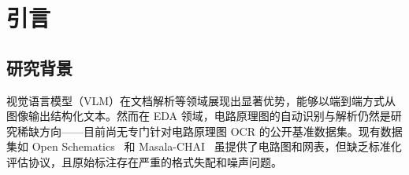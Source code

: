 \maketitle

\begin{abstract}
我们基于 PaddleOCR-VL-0.9B 训练了一个用于电路原理图 OCR 的模型，涵盖数据集构建、多阶段受控实验与完整开源生态。主要贡献如下：

(1) \textbf{数据集}：Dataset A 含 1,820 个经 7 轮递进式验证的标注样本（自动化校验 $\to$ 半自动清洗 $\to$ KiCad 网表交叉验证 $\to$ 人工抽检），标注准确率超 99\%。提供标注质量报告与多维难度标签体系。

(2) \textbf{合成数据防塌缩与规模化}：通过 \texttt{kicad-cli} 程序化生成 5,000 张 KiCad 原理图进行纯合成预训练，CompF1 达到 \textbf{0.304}——较基座提升 2.5$\times$。在真实电路输出对比中，Phase 1 (v2) 在全部 5 个测试样本上均显著优于此前 v1 (exp6)——可完整匹配元件标号和部分参数值，证明合成 KiCad 预训练是当前最有效的训练策略。发现合成文字数据以 20\% 比例混入训练集可有效对抗小数据集模态塌缩，CompF1 提升 4.2$\times$（0.037 $\to$ 0.156）。JointF1-norm（值归一化）和 LineAcc（行级匹配率）两个新指标取代原严格 JointF1，v2 在所有维度上均优于 v1。

(3) \textbf{系统消融实验}：Phase 1--4 共 8 组受控实验，系统对比分辨率、学习率、dropout、投影器状态、合成数据混合、LoRA 秩、SPICE 格式微调等维度。关键发现：冻结 Projector 层可防止模态塌缩；数据质量优先于数据数量。

(4) \textbf{完整开源}：数据集、LoRA 权重（v1: exp6, v2: Phase 1）、标注质量报告、技术报告、Beamer 演示、在线 Demo 均已发布。所有训练在单卡 RTX 4060 8GB 上完成。
\end{abstract}



\section{引言}

\subsection{研究背景}

视觉语言模型（VLM）在文档解析等领域展现出显著优势，能够以端到端方式从图像输出结构化文本。然而在 EDA 领域，电路原理图的自动识别与解析仍然是研究稀缺方向——目前尚无专门针对电路原理图 OCR 的公开基准数据集。现有数据集如 Open Schematics~\citep{openschematics2025} 和 Masala-CHAI~\citep{bhandari2025masalachai} 虽提供了电路图和网表，但缺乏标准化评估协议，且原始标注存在严重的格式失配和噪声问题。

